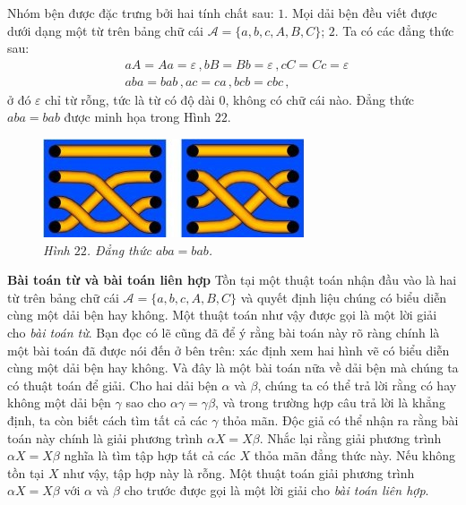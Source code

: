 \begin{multicols}{2}
\begin{figure}[H]
	\end{figure}
	Nhóm bện được đặc trưng bởi hai tính chất sau:
	\vskip 0.1cm
	$1$. Mọi dải bện đều viết được dưới dạng một từ trên bảng chữ cái $\mathcal A = \{a, b, c, A, B, C\}$;
	\vskip 0.1cm
	$2$. Ta có các đẳng thức sau:
	\begin{align*}
		&aA = Aa = \varepsilon\,, bB = Bb = \varepsilon\,, cC = Cc = \varepsilon\,\\
		&aba = bab\,, ac = ca\,, bcb = cbc\,,
	\end{align*}
	ở đó $\varepsilon$ chỉ từ rỗng, tức là từ có độ dài $0$, không có chữ cái nào. Đẳng thức $aba = bab$ được minh họa trong Hình $22$.
	\begin{figure}[H]
		\vspace*{-5pt}
		\centering
		\captionsetup{labelformat= empty, justification=centering}
		\includegraphics[width= 1\linewidth]{fig_22}
		\caption{\small\textit{\color{duongvaotoanhoc}Hình $22$. Đẳng thức $aba = bab$.}}
		\vspace*{-10pt}
	\end{figure}
	\textbf{\color{duongvaotoanhoc}Bài toán từ và bài toán liên hợp}
	\vskip 0.1cm
	Tồn tại một thuật toán nhận đầu vào là hai từ trên bảng chữ cái $\mathcal A = \{a, b, c, A, B, C\}$ và quyết định liệu chúng có biểu diễn cùng một dải bện hay không. Một thuật toán như vậy được gọi là một lời giải cho \textit{bài toán từ}. Bạn đọc có lẽ cũng đã để ý rằng bài toán này rõ ràng chính là một bài toán đã được nói đến ở bên trên: xác định xem hai hình vẽ có biểu diễn cùng một dải bện hay không.
	\vskip 0.1cm
	Và đây là một bài toán nữa về dải bện mà chúng ta có thuật toán để giải. Cho hai dải bện $\alpha$ và $\beta$, chúng ta có thể trả lời rằng có hay không một dải bện $\gamma$ sao cho $\alpha \gamma = \gamma \beta$, và trong trường hợp câu trả lời là khẳng định, ta còn biết cách tìm tất cả các $\gamma$ thỏa mãn. Độc giả có thể nhận ra rằng bài toán này chính là giải phương trình $\alpha X = X \beta$. Nhắc lại rằng giải phương trình $\alpha X = X \beta$ nghĩa là tìm tập hợp tất cả các $X$ thỏa mãn đẳng thức này. Nếu không tồn tại $X$ như vậy, tập hợp này là rỗng. Một thuật toán giải phương trình $\alpha X = X \beta$ với $\alpha$ và $\beta$ cho trước được gọi là một lời giải cho \textit{bài toán liên hợp}.

\end{multicols}
